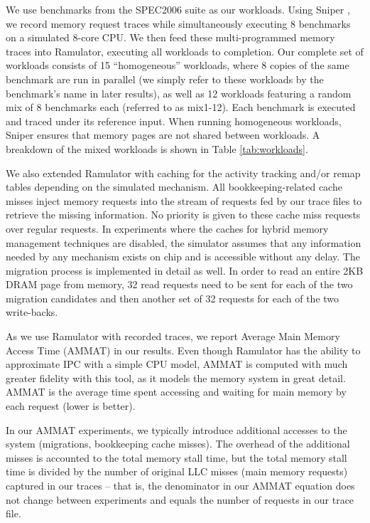 We use benchmarks from the SPEC2006 suite \cite{spec} as our workloads. Using Sniper \cite{sniper}, we record memory request traces while simultaneously executing 8 benchmarks on a simulated 8-core CPU. We then feed these multi-programmed memory traces into Ramulator, executing all workloads to completion. Our complete set of workloads consists of 15 ``homogeneous'' workloads, where 8 copies of the same benchmark are run in parallel (we simply refer to these workloads by the benchmark's name in later results), as well as 12 workloads featuring a random mix of 8 benchmarks each (referred to as mix1-12). Each benchmark is executed and traced under its reference input. When running homogeneous workloads, Sniper ensures that memory pages are not shared between workloads. A breakdown of the mixed workloads is shown in Table \ref{tab:workloads}.



We also extended Ramulator with caching for the activity tracking and/or remap tables depending on the simulated mechanism. All bookkeeping-related cache misses inject memory requests into the stream of requests fed by our trace files to retrieve the missing information. No priority is given to these cache miss requests over regular requests. In experiments where the caches for hybrid memory management techniques are disabled, the simulator assumes that any information needed by any mechanism exists on chip and is accessible without any delay. The migration process is implemented in detail as well. In order to read an entire 2KB DRAM page from memory, 32 read requests need to be sent for each of the two migration candidates and then another set of 32 requests for each of the two write-backs.

As we use Ramulator with recorded traces, we report Average Main Memory Access Time (AMMAT) in our results. Even though Ramulator has the ability to approximate IPC with a simple CPU model, 
AMMAT is computed with much greater fidelity with this tool,
as it models the memory system in great detail. AMMAT is the average time 
spent accessing and waiting for main memory by each request (lower is better). 

In our AMMAT experiments, we typically introduce additional accesses to the
system (migrations, bookkeeping cache misses).  The overhead of the additional misses is accounted to the total memory stall time, but the total memory  stall time is divided by the number of original LLC misses (main memory requests) captured in our traces -- that is, the denominator in our AMMAT equation does not change between experiments and equals the number of requests in our trace file.

